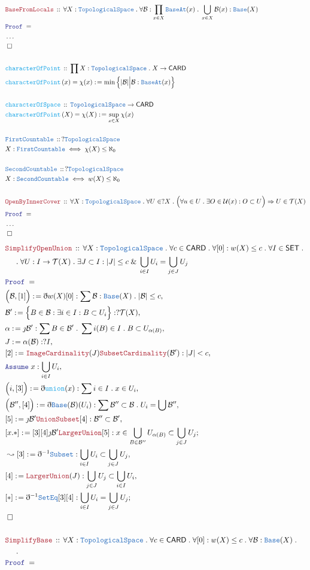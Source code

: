 \documentclass[12pt]{scrartcl}
\newcommand{\TYPE}[1]{\textcolor{NavyBlue}{\mathtt{#1}}}
\newcommand{\FUNC}[1]{\textcolor{Cerulean}{\mathtt{#1}}}
\newcommand{\LOGIC}[1]{\textcolor{Blue}{\mathtt{#1}}}
\newcommand{\THM}[1]{\textcolor{Maroon}{\mathtt{#1}}}
\renewcommand{\.}{\; . \;}
\newcommand{\de}{: \kern 0.1pc =}
\newcommand{\Act}[1]{\left( #1 \right)}
\newcommand{\Theorem}[2]{& \THM{#1} \, :: \, #2 \\ & \Proof = \\ }
\newcommand{\DeclareType}[2]{& \TYPE{#1} \, :: \, #2 \\}
\newcommand{\DefineType}[3]{& #1 : \TYPE{#2} \iff #3 \\}
\newcommand{\DeclareFunc}[2]{& \FUNC{#1} \, :: \, #2 \\}
\newcommand{\DefineNamedFunc}[4]{&  \FUNC{#1}\Act{#2} = #3 \de #4 \\}
\newcommand{\NewLine}{\\ & \kern 1pc}
\newcommand{\Page}[1]{ \begin{align*} #1 \end{align*}   }
\newcommand{ \bd }{ \ByDef }
\newcommand{\NoProof}{ & \ldots \\ \EndProof}
\renewcommand{\And}{\; \& \;}
\newcommand{\Imply}{\Rightarrow}
\newcommand{\Say}[3]{& #1 \de #2 : #3, \\}
\newcommand{\Conclude}[3]{& #1 \de #2 : #3; \\}
\newcommand{\Derive}[3]{& \leadsto #1 \de #2 : #3, \\}
\newcommand{\Assume}[2]{& \LOGIC{Assume} \; #1 : #2, \\}
\newcommand{\QED}{\; \square}
\newcommand{\EndProof}{& \QED \\}
\newcommand{\ByDef}{\eth}
\newcommand{\ByConstr}{\jmath}
\newcommand{\Proof}{\LOGIC{Proof} \; }
\newcommand{\B}{\mathcal{B}}
\newcommand{\SET}{\mathsf{SET}}
\newcommand{\TS}{\TYPE{TopologicalSpace}}
\newcommand{\T}{\mathcal{T}}
\renewcommand{\U}{\mathcal{U}}
\begin{document}
\Page{
	\Theorem{BaseFromLocals}
	{
		\forall X : \TS \. 
		\forall \B : \prod_{x \in X} \TYPE{BaseAt}(x) \.
		\bigcup_{x \in X} \B(x) : \TYPE{Base}(X)
	}
	\NoProof
	\\
	\DeclareFunc{characterOfPoint}
	{
		\prod X : \TS \.
		X \to \mathsf{CARD}
	}
	\DefineNamedFunc{characterOfPoint}{x}{\chi(x)}
	{
		\min\Big\{ |\B| \Big| \B : \TYPE{BaseAt}(x) \Big\}
	}
	\\
	\DeclareFunc{characterOfSpace}
	{
		\TS \to \mathsf{CARD}
	}
	\DefineNamedFunc{characterOfPoint}{X}{\chi(X)}
	{
		\sup_{x \in X} \chi(x)
	}
	\\
	\DeclareType{FirstCountable}{?\TS}
	\DefineType{X}{FirstCountable}{\chi(X) \le \aleph_0}
	\\
	\DeclareType{SecondCountable}{?\TS}
	\DefineType{X}{SecondCountable}{w(X) \le \aleph_0}
	\\
	\Theorem{OpenByInnerCover}
	{
		\forall X : \TS \.
		\forall U \in ?X \.
		\Big( \forall u \in U \. \exists O \in \U(x) : O \subset U \Big)
		\Imply
		U \in \T(X)
	}
	\NoProof
}\Page{
	\Theorem{SimplifyOpenUnion}
	{
		\forall X : \TS \.
		\forall c \in \mathsf{CARD} \. 
		\forall [0] : w(X) \le c \.
		\forall  I \in \SET \. \NewLine \. 
		\forall U : I \to \T(X) \.
		\exists J \subset I :
		|J| \le c \And \bigcup_{i \in I} U_i = \bigcup_{j \in J} U_j 
	}
	\Say{\Big(\B,[1]\Big)}{\bd w(X) [0]}
	{
		\sum \B : \TYPE{Base}(X) \. |\B| \le c
	}
	\Say{\B'}{\Big\{ B \in \B : \exists i \in I : B \subset U_i  \Big\}}
	{  ?\T(X)  }
	\Say{\alpha}{\ByConstr \B'}
	{\sum B \in \B' \. \sum i(B) \in I \. B \subset U_{\alpha(B)}} 	
	\Say{J}{\alpha(\B)}{?I}
	\Say{[2]}{\THM{ImageCardinality}(J)\THM{SubsetCardinality}(\B')}
	{ |J| < c  }
	\Assume{x}{\bigcup_{i \in I} U_i}
	\Say{\Big(i,[3]\Big)}{\bd \FUNC{union}(x)}{\sum i \in I \. x \in U_i}
	\Say{\Big(\B'',[4]\Big)}{\bd \TYPE{Base}(\B)(U_i)}
	{
		\sum \B'' \subset \B \. U_i = \bigcup \B'' 
	}
	\Say{[5]}{\ByConstr \B' \THM{UnionSubset}[4]}{\B'' \subset \B'}
	\Conclude{[x.*]}{[3][4]\ByConstr \B' \THM{LargerUnion}[5]}{
		x \in \bigcup_{B \in \B''} U_{\alpha(B)} 
		\subset \bigcup_{j \in J} U_j 
	}
	\Derive{[3]}{\bd^{-1}\TYPE{Subset}}
	{\bigcup_{i \in I} U_i \subset \bigcup_{j \in J} U_j}
	\Say{[4]}{\THM{LargerUnion}(J)}{\bigcup_{j \in J} U_j \subset \bigcup_{i \in I} U_i}
	\Conclude{[*]}{\bd^{-1}\TYPE{SetEq}[3][4]}
	{\bigcup_{i \in I}U_i = \bigcup_{j \in J}U_j}
	\EndProof
	\\
	\Theorem{SimplifyBase}
	{
		\forall X : \TS \.
		\forall c \in \mathsf{CARD} \. 
		\forall [0] : w(X) \le c \.
		\forall  \B :  \TYPE{Base}(X) \. \NewLine \. 
}}
\end{document}
